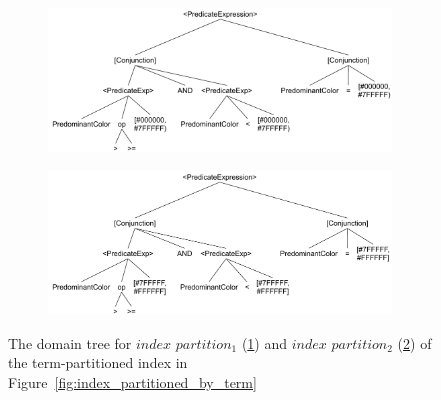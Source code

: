 \begin{figure}
  \begin{subfigure}{0.5\textwidth}
     \includegraphics[width=\linewidth]{./figures/case_studies/qpt_index_partitioning_terms_1.pdf}%
     \caption{}
     \label{fig:qpt_index_partitioning_terms_1}
  \end{subfigure}%
  \hspace*{\fill}
  \begin{subfigure}{0.5\textwidth}
    \includegraphics[width=\linewidth]{./figures/case_studies/qpt_index_partitioning_terms_2.pdf}%
    \caption{}
    \label{fig:qpt_index_partitioning_terms_2}
  \end{subfigure}%
\caption{The domain tree for $index$ $partition_1$ (\ref{fig:qpt_index_partitioning_terms_1}) and $index$ $partition_2$ (\ref{fig:qpt_index_partitioning_terms_2}) of the term-partitioned
index in Figure~\ref{fig:index_partitioned_by_term}}
\label{fig:qpt_index_partitioning_terms}
\end{figure}



